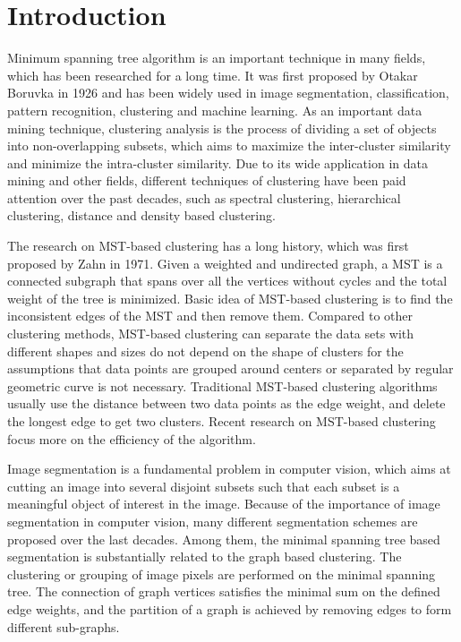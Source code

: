 \section{Introduction}
  Minimum spanning tree algorithm is an important technique in many fields, which has been researched for a long time. It was first proposed by Otakar Boruvka in 1926\cite{zbMATH02560699} and has been widely used in image segmentation\cite{An2000A, Xu19972D}, classification\cite{Juszczak2009Minimum}, pattern recognition\cite{Zhong2010A}, clustering\cite{Zahn1971Graph, Xu2002Clustering} and machine learning. As an important data mining technique, clustering analysis is the process of dividing a set of objects into non-overlapping subsets, which aims to maximize the inter-cluster similarity and minimize the intra-cluster similarity. Due to its wide application in data mining and other fields, different techniques of clustering have been paid attention over the past decades, such as spectral clustering\cite{Chang2008Robust}, hierarchical clustering\cite{Zhong2011Minimum}, distance and density based clustering\cite{G2016Distance}. 

  The research on MST-based clustering has a long history, which was first proposed by Zahn in 1971\cite{Zahn1971Graph}. Given a weighted and undirected graph, a MST is a connected subgraph that spans over all the vertices without cycles and the total weight of the tree is minimized. Basic idea of MST-based clustering is to find the inconsistent edges of the MST and then remove them. Compared to other clustering methods, MST-based clustering can separate the data sets with different shapes and sizes do not depend on the shape of clusters for the assumptions that data points are grouped around centers or separated by regular geometric curve is not necessary. Traditional MST-based clustering algorithms usually use the distance between two data points as the edge weight, and delete the longest edge to get two clusters. Recent research on MST-based clustering focus more on the efficiency of the algorithm\cite{Jothi2015Fast, Jothi2017Fast}.

  Image segmentation is a fundamental problem in computer vision, which aims at cutting an image into several disjoint subsets such that each subset is a meaningful object of interest in the image. Because of the importance of image segmentation in computer vision, many different segmentation schemes are proposed over the last decades. Among them, the minimal spanning tree based segmentation is substantially related to the graph based clustering\cite{7080012}. The clustering or grouping of image pixels are performed on the minimal spanning tree. The connection of graph vertices satisfies the minimal sum on the defined edge weights, and the partition of a graph is achieved by removing edges to form different sub-graphs.

